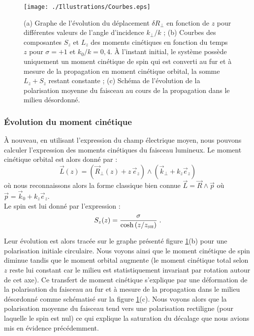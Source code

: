 \documentclass[a4paper,11pt]{article} %
\begin{document}
	
	\begin{figure}[h]
		\centering
		\begin{minipage}[c]{0.85\linewidth}
			\centering
			\texttt{[image: ./Illustrations/Courbes.eps]}
			\caption{(a) Graphe de l'évolution du déplacement $ \delta R_\perp $ en fonction de $ z $ pour différentes valeurs de l'angle d'incidence $k_\perp/k $ ; (b) Courbes des composantes $ S_z $ et $ L_z $ des moments cinétiques en fonction du temps $ z $ pour $ \sigma = + 1 $ et $ k_0 / k = 0,4 $. \`{A} l'instant initial, le système possède uniquement un moment cinétique de spin qui est converti au fur et à mesure de la propagation en moment cinétique orbital, la somme $ L_z + S_z $ restant constante ; (c) Schéma de l'évolution de la polarisation moyenne du faisceau au cours de la propagation dans le milieu désordonné.}
			\label{fig:Plot}
		\end{minipage}
	\end{figure}
	
	\subsubsection{\'Evolution du moment cinétique}
	\`A nouveau, en utilisant l'expression du champ électrique moyen, nous pouvons calculer l'expression des moments cinétiques du faisceau lumineux. Le moment cinétique orbital est alors donné par :
	\begin{equation*}
		\label{exp_L(z)}
		\vec{L}(z) = \left(\vec{R}_\perp(z) + z \, \vec{e}_z \right) \wedge ( \vec{k}_\perp + k_z \vec{e}_z ) 
	\end{equation*}
	où nous reconnaissons alors la forme classique bien connue $ \vec{L} = \vec{R} \wedge \vec{p} $ où $ \vec{p} = \vec{k}_0 + k_z \vec{e}_z $.\\
	
	Le spin est lui donné par l'expression :
	\begin{equation}
		\label{exp_S(z)}
		S_z(z) =  \frac{ \sigma}{ \cosh \left( z/z_\text{{\tiny SH}} \right) } \; .
	\end{equation}
	
	Leur évolution est alors tracée sur le graphe présenté figure \ref{fig:Plot}(b) pour une polarisation initiale circulaire. Nous voyons ainsi que le moment cinétique de spin diminue tandis que le moment orbital augmente (le moment cinétique total selon $ z $ reste lui constant car le milieu est statistiquement invariant par rotation autour de cet axe). Ce transfert de moment cinétique s'explique par une déformation de la polarisation du faisceau au fur et à mesure de la propagation dans le milieu désordonné comme schématisé sur la figure \ref{fig:Plot}(c). Nous voyons alors que la polarisation moyenne du faisceau tend vers une polarisation rectiligne (pour laquelle le spin est nul) ce qui explique la saturation du décalage que nous avions mis en évidence précédemment.
	
\end{document}
